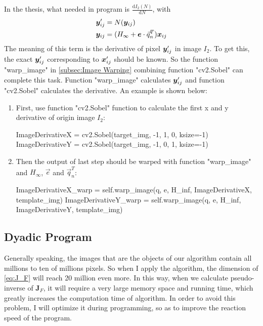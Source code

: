 In the thesis, what needed in program is $\frac{\mathrm{d} I_2(N)}{\mathrm{d}N} $, with
\begin{align}
		\boldsymbol{y}'_{ij} &= N(\boldsymbol{y}_{ij}) \nonumber \\
		\boldsymbol{y}_{ij} & = (H_{\infty} + \boldsymbol{e} \cdot \vec{q}_{n}^T) \boldsymbol{x}_{ij} \nonumber 
\end{align}
The meaning of this term is the derivative of pixel $\boldsymbol{y}'_{ij}$ in image $I_2$. To get this, the exact $\boldsymbol{y}'_{ij}$ corresponding to $\boldsymbol{x}'_{ij}$ should be known. So the function "warp\_image" in \cref{subsec:Image Warping} combining function "cv2.Sobel" can complete this task.  Function "warp\_image" calculates $\boldsymbol{y}'_{ij}$ and function "cv2.Sobel" calculates the derivative. An example is shown below:
\begin{enumerate}
	\item First, use function "cv2.Sobel" function to calculate the first x and y derivative of origin image $I_2$:
\begin{python}[caption={Derivative in x and y direction},label={lst:Model of Sobel Fildaster}]
	ImageDerivativeX = cv2.Sobel(target_img, -1, 1, 0, ksize=-1)
	ImageDerivativeY = cv2.Sobel(target_img, -1, 0, 1, ksize=-1)
\end{python}
\item Then the output of last step should be warped with function "warp\_image" and $H_{\infty}$,  $\vec{e}$ and $ \vec{q}_{n}^T$:
\begin{python}[caption={$\frac{\mathrm{d} I_2(N)}{\mathrm{d}N} $},label={lst:Model of Sdasobel Fildaster}]
	ImageDerivativeX_warp = self.warp_image(q, e, H_inf, ImageDerivativeX, template_img)
	ImageDerivativeY_warp = self.warp_image(q, e, H_inf, ImageDerivativeY, template_img)
\end{python}
\end{enumerate}

\subsection{Dyadic Program}\label{Dyadic Program}
Generally speaking, the images that are the objects of our algorithm contain all millions to ten of millions pixels. So when I apply the algorithm, the dimension of  \cref{eq:J_F} will reach 20 million even more. In this way, when we calculate pseudo-inverse of $\mathbf{J}_{F}$, it will require a very large memory space and running time, which greatly increases the computation time of algorithm. In order to avoid this problem, I will optimize it during programming, so as to improve the reaction speed of the program.

